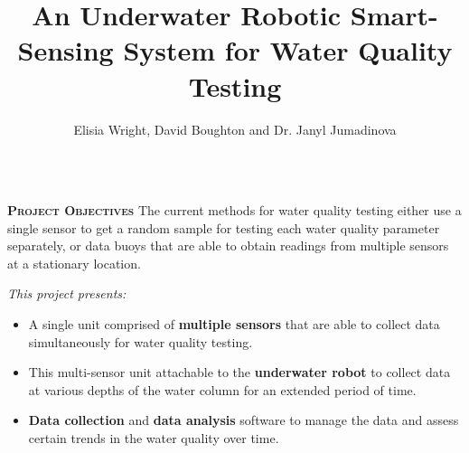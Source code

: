 \documentclass[final,t]{beamer}
\title[]{An Underwater Robotic Smart-Sensing System for Water Quality Testing }
\author[Wright]{Elisia Wright, David Boughton and Dr. Janyl Jumadinova}
\institute{Department of Computer Science, Allegheny College \\ Meadville, PA}
\begin{document}
    \begin{frame}{}
        \vspace*{-6mm}
        \begin{columns}[t]
        	\begin{column}{1\linewidth}

                \begin{alertblock}{\textsc{\textbf{Project Objectives}}}
                    \vspace*{3mm}
                    The current methods for water quality testing either use a
                    single sensor to get a random sample for testing each water
                    quality	parameter separately, or data buoys that are able to
                    obtain readings from multiple sensors at a stationary location.
                    \vspace{3mm}

                    \emph{This project presents:}
                    \begin{itemize}
                        \item A single unit comprised of \textbf{multiple sensors}
                        that are able to collect data simultaneously for water
                        quality testing.
                        \item This multi-sensor unit attachable to the \textbf{underwater robot}
                        to collect data at various depths of the water column for
                        an extended period of time.
                        \item \textbf{Data collection} and \textbf{data analysis}
                        software to manage the data and assess certain trends in
                        the water quality over time.
                    \end{itemize}
                    \vspace*{6mm}
                \end{alertblock}
			\end{column}
		\end{columns}


\end{frame}
\end{document}
